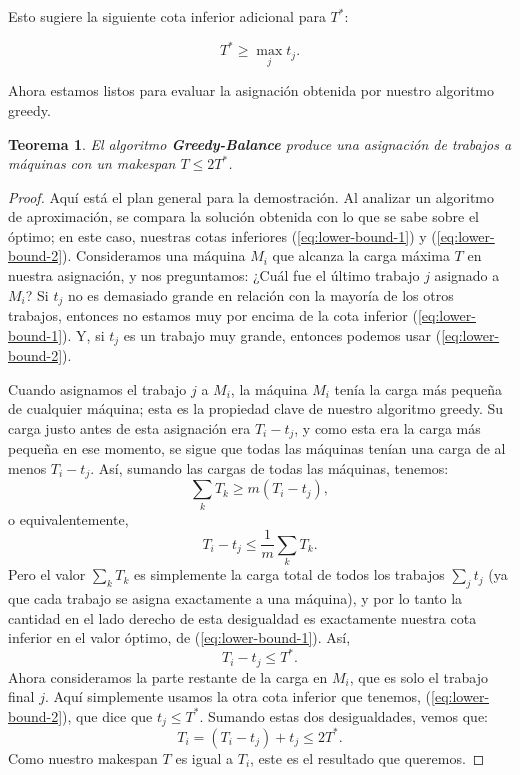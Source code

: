 \documentclass{report}
\newtheorem{theorem}{Teorema} %
\begin{document}
	Esto sugiere la siguiente cota inferior adicional para \( T^* \):
	
	\begin{equation} \label{eq:lower-bound-2}
		T^* \geq \max_j t_j.
	\end{equation}
	
	Ahora estamos listos para evaluar la asignación obtenida por nuestro algoritmo greedy.
	
	\begin{theorem}
		El algoritmo \textbf{Greedy-Balance} produce una asignación de trabajos a máquinas con un makespan \( T \leq 2T^* \).
	\end{theorem}
	
	\begin{proof}
		Aquí está el plan general para la demostración. Al analizar un algoritmo de aproximación, se compara la solución obtenida con lo que se sabe sobre el óptimo; en este caso, nuestras cotas inferiores (\ref{eq:lower-bound-1}) y (\ref{eq:lower-bound-2}). Consideramos una máquina \( M_i \) que alcanza la carga máxima \( T \) en nuestra asignación, y nos preguntamos: ¿Cuál fue el último trabajo \( j \) asignado a \( M_i \)? Si \( t_j \) no es demasiado grande en relación con la mayoría de los otros trabajos, entonces no estamos muy por encima de la cota inferior (\ref{eq:lower-bound-1}). Y, si \( t_j \) es un trabajo muy grande, entonces podemos usar (\ref{eq:lower-bound-2}).
		
		Cuando asignamos el trabajo \( j \) a \( M_i \), la máquina \( M_i \) tenía la carga más pequeña de cualquier máquina; esta es la propiedad clave de nuestro algoritmo greedy. Su carga justo antes de esta asignación era \( T_i - t_j \), y como esta era la carga más pequeña en ese momento, se sigue que todas las máquinas tenían una carga de al menos \( T_i - t_j \). Así, sumando las cargas de todas las máquinas, tenemos:
		\[
		\sum_k T_k \geq m(T_i - t_j),
		\]
		o equivalentemente,
		\[
		T_i - t_j \leq \frac{1}{m} \sum_k T_k.
		\]
		Pero el valor \( \sum_k T_k \) es simplemente la carga total de todos los trabajos \( \sum_j t_j \) (ya que cada trabajo se asigna exactamente a una máquina), y por lo tanto la cantidad en el lado derecho de esta desigualdad es exactamente nuestra cota inferior en el valor óptimo, de (\ref{eq:lower-bound-1}). Así,
		\[
		T_i - t_j \leq T^*.
		\]
		Ahora consideramos la parte restante de la carga en \( M_i \), que es solo el trabajo final \( j \). Aquí simplemente usamos la otra cota inferior que tenemos, (\ref{eq:lower-bound-2}), que dice que \( t_j \leq T^* \). Sumando estas dos desigualdades, vemos que:
		\[
		T_i = (T_i - t_j) + t_j \leq 2T^*.
		\]
		Como nuestro makespan \( T \) es igual a \( T_i \), este es el resultado que queremos.
	\end{proof}
	
\end{document}

